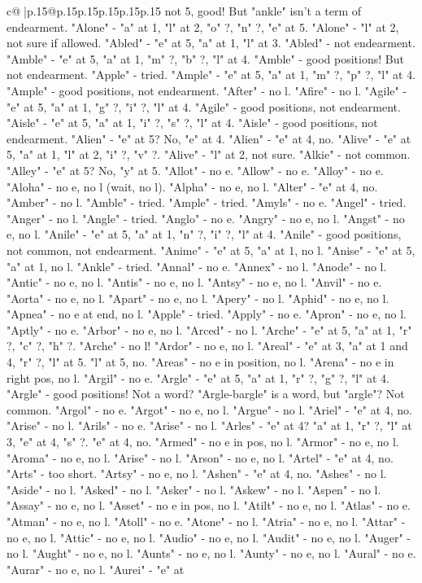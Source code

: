 \documentclass{article}
\begin{document}
{\begin{supertabular}{c@{$\;$}|p{.15\linewidth}@{}p{.15\linewidth}p{.15\linewidth}p{.15\linewidth}p{.15\linewidth}p{.15\linewidth}}
{{{not 5, good! But "ankle" isn't a term of endearment. "Alone" {-} "a" at 1, "l" at 2, "o" ?, "n" ?, "e" at 5. "Alone" {-} "l" at 2, not sure if allowed. "Abled" {-} "e" at 5, "a" at 1, "l" at 3. "Abled" {-} not endearment. "Amble" {-} "e" at 5, "a" at 1, "m" ?, "b" ?, "l" at 4. "Amble" {-} good positions! But not endearment. "Apple" {-} tried. "Ample" {-} "e" at 5, "a" at 1, "m" ?, "p" ?, "l" at 4. "Ample" {-} good positions, not endearment. "After" {-} no l. "Afire" {-} no l. "Agile" {-} "e" at 5, "a" at 1, "g" ?, "i" ?, "l" at 4. "Agile" {-} good positions, not endearment. "Aisle" {-} "e" at 5, "a" at 1, "i" ?, "s" ?, "l" at 4. "Aisle" {-} good positions, not endearment. "Alien" {-} "e" at 5? No, "e" at 4. "Alien" {-} "e" at 4, no. "Alive" {-} "e" at 5, "a" at 1, "l" at 2, "i" ?, "v" ?. "Alive" {-} "l" at 2, not sure. "Alkie" {-} not common. "Alley" {-} "e" at 5? No, "y" at 5. "Allot" {-} no e. "Allow" {-} no e. "Alloy" {-} no e. "Aloha" {-} no e, no l (wait, no l). "Alpha" {-} no e, no l. "Alter" {-} "e" at 4, no. "Amber" {-} no l. "Amble" {-} tried. "Ample" {-} tried. "Amyls" {-} no e. "Angel" {-} tried. "Anger" {-} no l. "Angle" {-} tried. "Anglo" {-} no e. "Angry" {-} no e, no l. "Angst" {-} no e, no l. "Anile" {-} "e" at 5, "a" at 1, "n" ?, "i" ?, "l" at 4. "Anile" {-} good positions, not common, not endearment. "Anime" {-} "e" at 5, "a" at 1, no l. "Anise" {-} "e" at 5, "a" at 1, no l. "Ankle" {-} tried. "Annal" {-} no e. "Annex" {-} no l. "Anode" {-} no l. "Antic" {-} no e, no l. "Antis" {-} no e, no l. "Antsy" {-} no e, no l. "Anvil" {-} no e. "Aorta" {-} no e, no l. "Apart" {-} no e, no l. "Apery" {-} no l. "Aphid" {-} no e, no l. "Apnea" {-} no e at end, no l. "Apple" {-} tried. "Apply" {-} no e. "Apron" {-} no e, no l. "Aptly" {-} no e. "Arbor" {-} no e, no l. "Arced" {-} no l. "Arche" {-} "e" at 5, "a" at 1, "r" ?, "c" ?, "h" ?. "Arche" {-} no l! "Ardor" {-} no e, no l. "Areal" {-} "e" at 3, "a" at 1 and 4, "r" ?, "l" at 5. "l" at 5, no. "Areas" {-} no e in position, no l. "Arena" {-} no e in right pos, no l. "Argil" {-} no e. "Argle" {-} "e" at 5, "a" at 1, "r" ?, "g" ?, "l" at 4. "Argle" {-} good positions! Not a word? "Argle{-}bargle" is a word, but "argle"? Not common. "Argol" {-} no e. "Argot" {-} no e, no l. "Argue" {-} no l. "Ariel" {-} "e" at 4, no. "Arise" {-} no l. "Arils" {-} no e. "Arise" {-} no l. "Arles" {-} "e" at 4? "a" at 1, "r" ?, "l" at 3, "e" at 4, "s" ?. "e" at 4, no. "Armed" {-} no e in pos, no l. "Armor" {-} no e, no l. "Aroma" {-} no e, no l. "Arise" {-} no l. "Arson" {-} no e, no l. "Artel" {-} "e" at 4, no. "Arts" {-} too short. "Artsy" {-} no e, no l. "Ashen" {-} "e" at 4, no. "Ashes" {-} no l. "Aside" {-} no l. "Asked" {-} no l. "Asker" {-} no l. "Askew" {-} no l. "Aspen" {-} no l. "Assay" {-} no e, no l. "Asset" {-} no e in pos, no l. "Atilt" {-} no e, no l. "Atlas" {-} no e. "Atman" {-} no e, no l. "Atoll" {-} no e. "Atone" {-} no l. "Atria" {-} no e, no l. "Attar" {-} no e, no l. "Attic" {-} no e, no l. "Audio" {-} no e, no l. "Audit" {-} no e, no l. "Auger" {-} no l. "Aught" {-} no e, no l. "Aunts" {-} no e, no l. "Aunty" {-} no e, no l. "Aural" {-} no e. "Aurar" {-} no e, no l. "Aurei" {-} "e" at }}}
\end{supertabular}}
\end{document}
